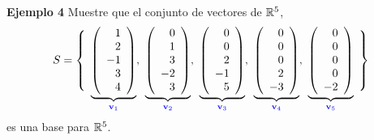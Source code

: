 {\begin{frame}
\begin{ej}{\textbf{Ejemplo 4}} \justifying
	Muestre que el conjunto de vectores de $\mathbb{R}^5$,
	{\small 
	\[	
     S = 
	 \left\{ \begin{array}{c@{\hspace{-\tabcolsep}}} \phantom{.}\\ \phantom{.}\\ \phantom{\vdots} \\[1mm] \phantom{.} \end{array} \right.
	 \underbrace{\left(\begin{array}{r} 1\\ 2\\ -1 \\ 3 \\ 4 \end{array} \right)}_{\color{blue}\mathbf{v}_1},\
	 \underbrace{\left(\begin{array}{r} 0\\ 1\\ 3 \\ -2 \\ 3 \end{array} \right)}_{\color{blue}\mathbf{v}_2},\
	 \underbrace{\left(\begin{array}{r} 0\\ 0\\ 2 \\ -1 \\ 5 \end{array} \right)}_{\color{blue}\mathbf{v}_3},\
	 \underbrace{\left(\begin{array}{r} 0\\ 0\\ 0 \\ 2 \\ -3 \end{array} \right)}_{\color{blue}\mathbf{v}_4},\
	 \underbrace{\left(\begin{array}{r} 0\\ 0\\ 0 \\ 0 \\ -2 \end{array} \right)}_{\color{blue}\mathbf{v}_5}
	 \left. \begin{array}{c@{\hspace{-\tabcolsep}}} \phantom{.}\\ \phantom{.}\\ \phantom{\vdots} \\[1mm] \phantom{.} \end{array} \right\}
	\]
	}
	es una base para $\mathbb{R}^5$.
\end{ej}	

\end{frame}
}

